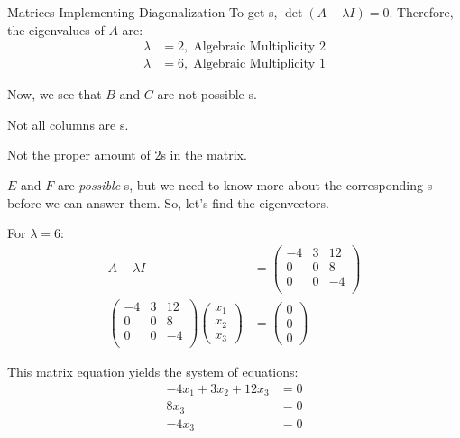 \begin{example}{Matrices Implementing Diagonalization}
  To get s, $\det(A - \lambda I) = 0$.
  Therefore, the eigenvalues of $A$ are:
  \begin{align*}
    \lambda &= 2, \; \text{Algebraic Multiplicity 2} \\
    \lambda &= 6, \; \text{Algebraic Multiplicity 1}
  \end{align*}

  Now, we see that $B$ and $C$ are not possible s.
  \begin{description}[noitemsep]
  \item[$B$] Not all columns are s.
  \item[$C$] Not the proper amount of $2$s in the matrix.
  \end{description}

  $E$ and $F$ are \textit{possible} s, but we need to know more about the corresponding s before we can answer them.
  So, let's find the eigenvectors.

  For $\lambda = 6$:
  \begin{align*}
    A - \lambda I &=
                    \begin{pmatrix}
                      -4 & 3 & 12 \\
                      0 & 0 & 8 \\
                      0 & 0 & -4 \\
                    \end{pmatrix} \\
    \begin{pmatrix}
      -4 & 3 & 12 \\
      0 & 0 & 8 \\
      0 & 0 & -4 \\
    \end{pmatrix}
    \begin{pmatrix}
      x_{1} \\ x_{2} \\ x_{3}
    \end{pmatrix} &=
                    \begin{pmatrix}
                      0 \\ 0 \\ 0
                    \end{pmatrix}
  \end{align*}

  This matrix equation yields the system of equations:
  \begin{align*}
    -4x_{1} + 3x_{2} + 12x_{3} &= 0 \\
    8x_{3} &= 0 \\
    -4x_{3} &= 0
  \end{align*}


\end{example}
